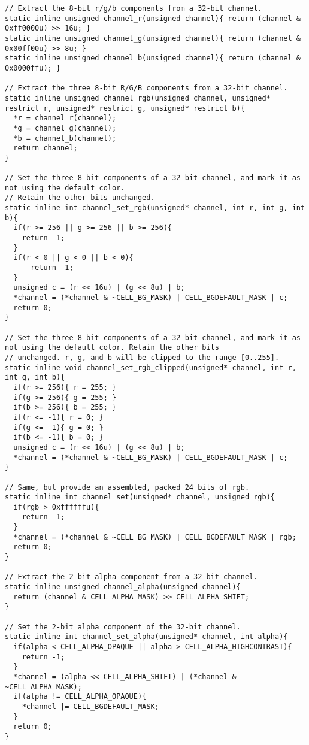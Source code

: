 \bgroup
\begin{verbatim}
// Extract the 8-bit r/g/b components from a 32-bit channel.
static inline unsigned channel_r(unsigned channel){ return (channel & 0xff0000u) >> 16u; }
static inline unsigned channel_g(unsigned channel){ return (channel & 0x00ff00u) >> 8u; }
static inline unsigned channel_b(unsigned channel){ return (channel & 0x0000ffu); }

// Extract the three 8-bit R/G/B components from a 32-bit channel.
static inline unsigned channel_rgb(unsigned channel, unsigned* restrict r, unsigned* restrict g, unsigned* restrict b){
  *r = channel_r(channel);
  *g = channel_g(channel);
  *b = channel_b(channel);
  return channel;
}

// Set the three 8-bit components of a 32-bit channel, and mark it as not using the default color.
// Retain the other bits unchanged.
static inline int channel_set_rgb(unsigned* channel, int r, int g, int b){
  if(r >= 256 || g >= 256 || b >= 256){
    return -1;
  }
  if(r < 0 || g < 0 || b < 0){
      return -1;
  }
  unsigned c = (r << 16u) | (g << 8u) | b;
  *channel = (*channel & ~CELL_BG_MASK) | CELL_BGDEFAULT_MASK | c;
  return 0;
}

// Set the three 8-bit components of a 32-bit channel, and mark it as not using the default color. Retain the other bits
// unchanged. r, g, and b will be clipped to the range [0..255].
static inline void channel_set_rgb_clipped(unsigned* channel, int r, int g, int b){
  if(r >= 256){ r = 255; }
  if(g >= 256){ g = 255; }
  if(b >= 256){ b = 255; }
  if(r <= -1){ r = 0; }
  if(g <= -1){ g = 0; }
  if(b <= -1){ b = 0; }
  unsigned c = (r << 16u) | (g << 8u) | b;
  *channel = (*channel & ~CELL_BG_MASK) | CELL_BGDEFAULT_MASK | c;
}

// Same, but provide an assembled, packed 24 bits of rgb.
static inline int channel_set(unsigned* channel, unsigned rgb){
  if(rgb > 0xffffffu){
    return -1;
  }
  *channel = (*channel & ~CELL_BG_MASK) | CELL_BGDEFAULT_MASK | rgb;
  return 0;
}

// Extract the 2-bit alpha component from a 32-bit channel.
static inline unsigned channel_alpha(unsigned channel){
  return (channel & CELL_ALPHA_MASK) >> CELL_ALPHA_SHIFT;
}

// Set the 2-bit alpha component of the 32-bit channel.
static inline int channel_set_alpha(unsigned* channel, int alpha){
  if(alpha < CELL_ALPHA_OPAQUE || alpha > CELL_ALPHA_HIGHCONTRAST){
    return -1;
  }
  *channel = (alpha << CELL_ALPHA_SHIFT) | (*channel & ~CELL_ALPHA_MASK);
  if(alpha != CELL_ALPHA_OPAQUE){
    *channel |= CELL_BGDEFAULT_MASK;
  }
  return 0;
}


\end{verbatim}
